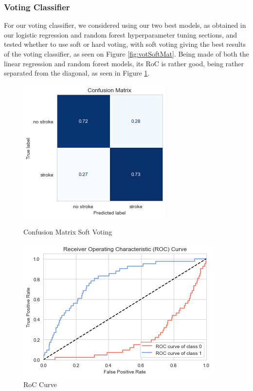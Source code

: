 \documentclass[11pt, a4paper]{article}
\begin{document}
\subsubsection{Voting Classifier}

For our voting classifier, we considered using our two best models, as obtained in our logistic regression and random forest hyperparameter tuning sections, and tested whether to use soft or hard voting, with soft voting giving the best results of the voting classifier, as seen on Figure \ref{fig:votSoftMat}. Being made of both the linear regression and random forest models, its RoC is rather good, being rather separated from the diagonal, as seen in Figure \ref{fig:RoCVoting}.


\begin{figure}[H]
    \includegraphics[width=\textwidth]{images/softConfMat.png}
    \caption{Confusion Matrix Soft Voting}
    \label{fig:votSoftMat}
\endminipage\hfill
{}
    \includegraphics[width=\textwidth]{images/rocVoting.png}
    \caption{RoC Curve}
    \label{fig:RoCVoting}
\endminipage\hfill
\end{figure}
\end{document}
